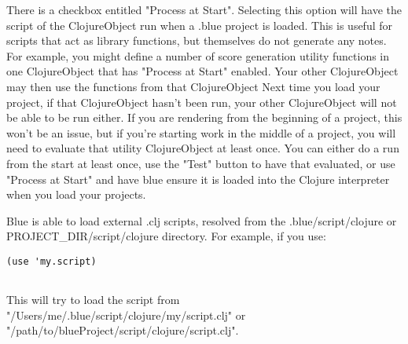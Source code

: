 There is a checkbox entitled "Process at Start". Selecting this option
will have the script of the ClojureObject run when a .blue project is
loaded. This is useful for scripts that act as library functions, but
themselves do not generate any notes. For example, you might define a
number of score generation utility functions in one ClojureObject that
has "Process at Start" enabled. Your other ClojureObject may then use
the functions from that ClojureObject Next time you load your project,
if that ClojureObject hasn't been run, your other ClojureObject will not
be able to be run either. If you are rendering from the beginning of a
project, this won't be an issue, but if you're starting work in the
middle of a project, you will need to evaluate that utility
ClojureObject at least once. You can either do a run from the start at
least once, use the "Test" button to have that evaluated, or use
"Process at Start" and have blue ensure it is loaded into the Clojure
interpreter when you load your projects.

Blue is able to load external .clj scripts, resolved from the
.blue/script/clojure or PROJECT\_DIR/script/clojure directory. For
example, if you use:

\begin{verbatim}
(use 'my.script)      
    
\end{verbatim}

This will try to load the script from
"/Users/me/.blue/script/clojure/my/script.clj" or
"/path/to/blueProject/script/clojure/script.clj".

